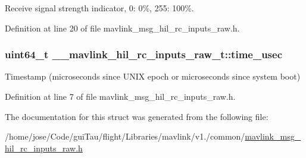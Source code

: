 Receive signal strength indicator, 0\-: 0\%, 255\-: 100\%. 



Definition at line 20 of file mavlink\-\_\-msg\-\_\-hil\-\_\-rc\-\_\-inputs\-\_\-raw.\-h.

\hypertarget{struct____mavlink__hil__rc__inputs__raw__t_a17665e54cab99a69ff2e6d3b8ae63928}{
\subsubsection[{time\-\_\-usec}]{\setlength{\rightskip}{0pt plus 5cm}uint64\-\_\-t \-\_\-\-\_\-mavlink\-\_\-hil\-\_\-rc\-\_\-inputs\-\_\-raw\-\_\-t\-::time\-\_\-usec}}\label{struct____mavlink__hil__rc__inputs__raw__t_a17665e54cab99a69ff2e6d3b8ae63928}


Timestamp (microseconds since U\-N\-I\-X epoch or microseconds since system boot) 



Definition at line 7 of file mavlink\-\_\-msg\-\_\-hil\-\_\-rc\-\_\-inputs\-\_\-raw.\-h.



The documentation for this struct was generated from the following file\-:\begin{DoxyCompactItemize}
\item 
/home/jose/\-Code/gui\-Tau/flight/\-Libraries/mavlink/v1./common/\hyperlink{mavlink__msg__hil__rc__inputs__raw_8h}{mavlink\-\_\-msg\-\_\-hil\-\_\-rc\-\_\-inputs\-\_\-raw.\-h}\end{DoxyCompactItemize}
